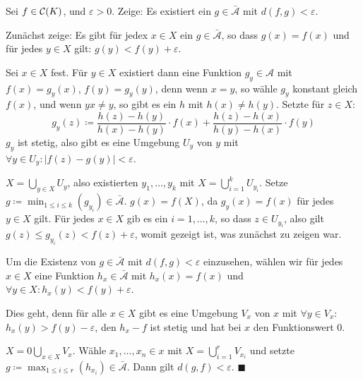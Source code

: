 \documentclass[12pt]{scrbook}   %
\newcommand{\qed}{\phantom{.}\hfill{$\blacksquare$}}
\newcommand{\da}{\coloneqq}
\begin{document}
Sei $f\in {\cal C}(K)$, und $\varepsilon >0$. Zeige: Es existiert ein $g\in \bar{\mathcal A}$ mit $d(f,g)<\varepsilon$.

Zunächst zeige: Es gibt für jedex $x\in X$ ein $g\in \bar{\mathcal A}$, so dass $g(x)=f(x)$ und für jedes $y\in X$ gilt: $g(y)<f(y)+\varepsilon$.

Sei $x\in X$ fest. Für $y\in X$ existiert dann eine Funktion $g_y\in \mathcal A$ mit $f(x) = g_y(x)$, $f(y) = g_y(y)$, denn wenn $x=y$, so wähle $g_y$ konstant gleich $f(x)$, und wenn $yx\ne y$, so gibt es ein $h$ mit $h(x)\ne h(y)$. Setzte für $z\in X$:
\[
g_y(z) \da \frac{h(z) -h(y)}{h(x)-h(y)}\cdot f(x) + \frac{h(z) - h(x)}{h(y) - h(x)}\cdot f(y)
\]
$g_y$ ist stetig, also gibt es eine Umgebung $U_y$ von $y$ mit $\forall y\in U_y: |f(z)-g(y)|<\varepsilon$.

$X = \bigcup_{y\in X}U_y$, also existierten $y_1,\ldots,y_k$ mit $X=\bigcup_{i=1}^k U_{y_i}$. Setze $g\da \min_{1\le i\le k}(g_{y_i})\in \bar{\mathcal A}$. $g(x) = f(X)$, da $g_y(x)=f(x)$ für jedes $y\in X$ gilt. Für jedes $x\in X$ gib es ein $i=1,\ldots,k$, so dass $z\in U_{y_i}$, also gilt $g(z) \le g_{y_i}(z)< f(z) + \varepsilon$, womit gezeigt ist, was zunächst zu zeigen war.

Um die Existenz von $g\in \bar{\mathcal A}$ mit $d(f,g)<\varepsilon$ einzusehen, wählen wir für jedes $x\in X$ eine Funktion $h_x\in \bar{\mathcal A}$ mit $h_x(x)=f(x)$ und $\forall y\in X: h_x(y) < f(y) + \varepsilon$.

Dies geht, denn für alle $x\in X$ gibt es eine Umgebung $V_x$ von $x$ mit $\forall y\in V_x$: $h_x(y) > f(y) -\varepsilon$, den $h_x - f$ ist stetig und hat bei $x$ den Funktionswert $0$.

$X=0\bigcup_{x\in X}V_x$. Wähle $x_1,\ldots,x_n\in x$ mit $X=\bigcup_{i=1}^r V_{x_i}$ und setzte $g\da \max_{1\le i \le r}(h_{x_i}) \in \bar{\mathcal A}$. Dann gilt $d(g,f)<\varepsilon$.
\qed
\end{document}
